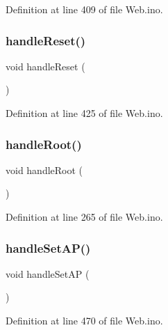 Definition at line 409 of file Web.\+ino.

\mbox{\label{_web_8ino_a28576d900afa7ce8f3f4177cb38f61b9}} 
\subsubsection{\texorpdfstring{handleReset()}{handleReset()}}
{\footnotesize\ttfamily void handle\+Reset (\begin{DoxyParamCaption}{ }\end{DoxyParamCaption})}



Definition at line 425 of file Web.\+ino.

\mbox{\label{_web_8ino_a8427468f39342a1990703e9f5ce7fd29}} 
\subsubsection{\texorpdfstring{handleRoot()}{handleRoot()}}
{\footnotesize\ttfamily void handle\+Root (\begin{DoxyParamCaption}{ }\end{DoxyParamCaption})}



Definition at line 265 of file Web.\+ino.

\mbox{\label{_web_8ino_abc559dd4a64f6e15aff6bb8377de1e5c}} 
\subsubsection{\texorpdfstring{handleSetAP()}{handleSetAP()}}
{\footnotesize\ttfamily void handle\+Set\+AP (\begin{DoxyParamCaption}{ }\end{DoxyParamCaption})}



Definition at line 470 of file Web.\+ino.

\mbox{\label{_web_8ino_af87f54300d1d09b658c30cff92a27f5b}} 
